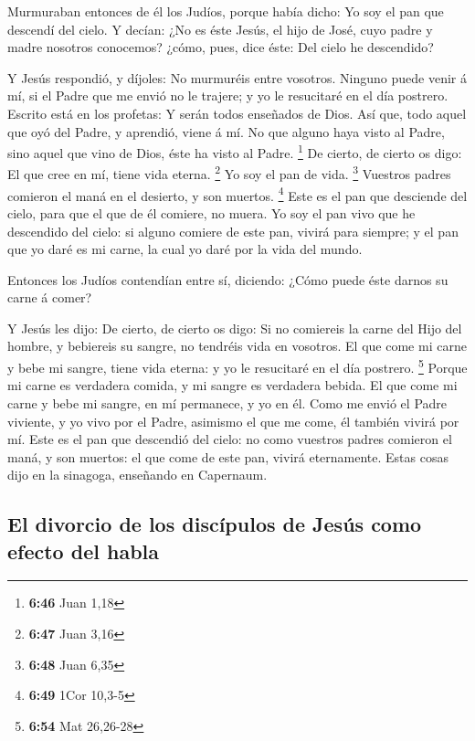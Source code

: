  Murmuraban entonces de él los Judíos, porque había
dicho: Yo soy el pan que descendí del cielo.  Y decían:
¿No es éste Jesús, el hijo de José, cuyo padre y madre nosotros
conocemos? ¿cómo, pues, dice éste: Del cielo he descendido?

 Y Jesús respondió, y díjoles: No murmuréis entre
vosotros.  Ninguno puede venir á mí, si el Padre que me
envió no le trajere; y yo le resucitaré en el día postrero.
 Escrito está en los profetas: Y serán todos enseñados de
Dios. Así que, todo aquel que oyó del Padre, y aprendió, viene á mí.
 No que alguno haya visto al Padre, sino aquel que vino
de Dios, éste ha visto al Padre. \footnote{\textbf{6:46} Juan 1,18}
 De cierto, de cierto os digo: El que cree en mí, tiene
vida eterna. \footnote{\textbf{6:47} Juan 3,16}  Yo soy
el pan de vida. \footnote{\textbf{6:48} Juan 6,35} 
Vuestros padres comieron el maná en el desierto, y son muertos.
\footnote{\textbf{6:49} 1Cor 10,3-5}  Este es el pan que
desciende del cielo, para que el que de él comiere, no muera.
 Yo soy el pan vivo que he descendido del cielo: si
alguno comiere de este pan, vivirá para siempre; y el pan que yo daré es
mi carne, la cual yo daré por la vida del mundo.

 Entonces los Judíos contendían entre sí, diciendo: ¿Cómo
puede éste darnos su carne á comer?

 Y Jesús les dijo: De cierto, de cierto os digo: Si no
comiereis la carne del Hijo del hombre, y bebiereis su sangre, no
tendréis vida en vosotros.  El que come mi carne y bebe
mi sangre, tiene vida eterna: y yo le resucitaré en el día postrero.
\footnote{\textbf{6:54} Mat 26,26-28}  Porque mi carne es
verdadera comida, y mi sangre es verdadera bebida.  El
que come mi carne y bebe mi sangre, en mí permanece, y yo en él.
 Como me envió el Padre viviente, y yo vivo por el Padre,
asimismo el que me come, él también vivirá por mí.  Este
es el pan que descendió del cielo: no como vuestros padres comieron el
maná, y son muertos: el que come de este pan, vivirá eternamente.
 Estas cosas dijo en la sinagoga, enseñando en Capernaum.

\hypertarget{el-divorcio-de-los-discuxedpulos-de-jesuxfas-como-efecto-del-habla}{%
\subsection{El divorcio de los discípulos de Jesús como efecto del
habla}\label{el-divorcio-de-los-discuxedpulos-de-jesuxfas-como-efecto-del-habla}}

